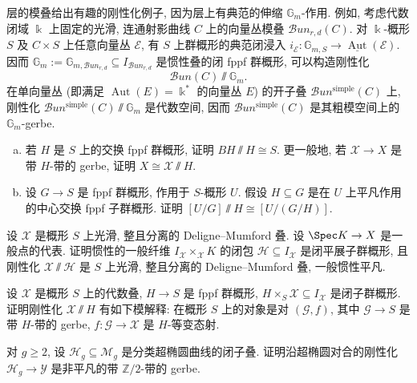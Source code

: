 \begin{example}\label{src:7.4.57}
层的模叠给出有趣的刚性化例子, 因为层上有典范的伸缩 $\mathbb G_m$-作用. 例如, 考虑代数闭域 $\Bbbk$ 上固定的光滑, 连通射影曲线 $C$ 上的向量丛模叠 $\mathcal B\!un_{r,d}(C)$. 对 $\Bbbk$-概形 $S$ 及 $C\times S$ 上任意向量丛 $\mathcal E$, 有 $S$ 上群概形的典范闭浸入 $i_{\mathcal E}:\mathbb G_{m,S}\to\underline{\operatorname{Aut}}(\mathcal E)$. 因而 $\mathbb G_m:=\mathbb G_{m,\mathcal B\!un_{r,d}}\subseteq I_{\mathcal B\!un_{r,d}}$ 是惯性叠的闭 fppf 群概形, 可以构造刚性化
\[
\mathcal B\!un(C)\!\sslash\mathbb G_m.
\]
在单向量丛 (即满足 $\operatorname{Aut}(E)=\Bbbk^*$ 的向量丛 $E$) 的开子叠 $\mathcal B\!un^{\mathrm{simple}}(C)$ 上, 刚性化 $\mathcal B\!un^{\mathrm{simple}}(C)\!\sslash\mathbb G_m$ 是代数空间, 因而 $\mathcal B\!un^{\mathrm{simple}}(C)$ 是其粗模空间上的 $\mathbb G_m$-gerbe.
\end{example}
\begin{exercise}\label{src:7.4.58}
\begin{enumerate}[(a)]
\item 若 $H$ 是 $S$ 上的交换 fppf 群概形, 证明 $BH\!\sslash H\cong S$. 更一般地, 若 $\mathcal X\to X$ 是带 $H$-带的 gerbe, 证明 $X\cong\mathcal X\!\sslash H$.
\item 设 $G\to S$ 是 fppf 群概形, 作用于 $S$-概形 $U$. 假设 $H\subseteq G$ 是在 $U$ 上平凡作用的中心交换 fppf 子群概形. 证明 $[U/G]\!\sslash H\cong[U/(G/H)]$.
\end{enumerate}
\end{exercise}
\begin{exercise}\label{src:7.4.59}
设 $\mathcal X$ 是概形 $S$ 上光滑, 整且分离的 Deligne--Mumford 叠. 设 $\Spec K\to\mathcal X$ 是一般点的代表. 证明惯性的一般纤维 $I_{\mathcal X}\times_{\mathcal X}K$ 的闭包 $\mathcal H\subseteq I_{\mathcal X}$ 是闭平展子群概形, 且刚性化 $\mathcal X\!\sslash\mathcal H$ 是 $S$ 上光滑, 整且分离的 Deligne--Mumford 叠, 一般惯性平凡.
\end{exercise}
\begin{exercise}\label{src:7.4.60}
设 $\mathcal X$ 是概形 $S$ 上的代数叠, $H\to S$ 是 fppf 群概形, $H\times_S\mathcal X\subseteq I_{\mathcal X}$ 是闭子群概形. 证明刚性化 $\mathcal X\!\sslash H$ 有如下模解释: 在概形 $S$ 上的对象是对 $(\mathcal G,f)$, 其中 $\mathcal G\to S$ 是带 $H$-带的 gerbe, $f:\mathcal G\to\mathcal X$ 是 $H$-等变态射.
\end{exercise}
\begin{exercise}\label{src:7.4.61}
对 $g\geq2$, 设 $\mathcal H_g\subseteq\mathcal M_g$ 是分类超椭圆曲线的闭子叠. 证明沿超椭圆对合的刚性化 $\mathcal H_g\to\mathcal Y$ 是非平凡的带 $\mathbb Z/2$-带的 gerbe.
\end{exercise}
